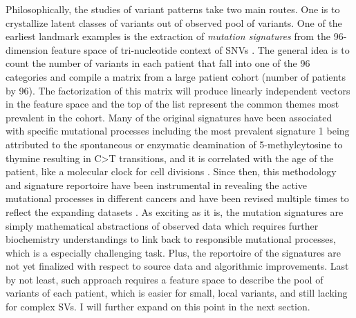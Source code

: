 \documentclass[phd,tocprelim]{cornell}
\begin{document}
Philosophically, the studies of variant patterns take two main routes. One is to crystallize latent classes of variants out of observed pool of variants. One of the earliest landmark examples is the extraction of \textit{mutation signatures} from the 96-dimension feature space of tri-nucleotide context of SNVs \cite{Alexandrov2013-zv}. The general idea is to count the number of variants in each patient that fall into one of the 96 categories and compile a matrix from a large patient cohort (number of patients by 96). The factorization of this matrix will produce linearly independent vectors in the feature space and the top of the list represent the common themes most prevalent in the cohort. Many of the original signatures have been associated with specific mutational processes including the most prevalent signature 1 being attributed to the spontaneous or enzymatic deamination of 5-methylcytosine to thymine resulting in C>T transitions, and it is correlated with the age of the patient, like a molecular clock for cell divisions \cite{alexandrov2013}. Since then, this methodology and signature reportoire have been instrumental in revealing the active mutational processes in different cancers \cite{Choi2021-pu} and have been revised multiple times to reflect the expanding datasets \cite{Alexandrov2020-by}. As exciting as it is, the mutation signatures are simply mathematical abstractions of observed data which requires further biochemistry understandings to link back to responsible mutational processes, which is a especially challenging task. Plus, the reportoire of the signatures are not yet finalized with respect to source data and algorithmic improvements. Last by not least, such approach requires a feature space to describe the pool of variants of each patient, which is easier for small, local variants, and still lacking for complex SVs. I will further expand on this point in the next section.
\end{document}
